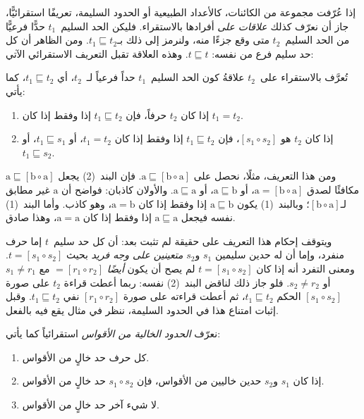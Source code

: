 \documentclass[../../../include/open-logic-section]{subfiles}
\begin{document}


إذا عُرّفت مجموعة من الكائنات، كالأعداد الطبيعية أو الحدود السليمة،
تعريفًا استقرائيًّا، جاز أن نعرّف كذلك \emph{علاقات على} أفرادها
بالاستقراء. فليكن الحد السليم~$t_1$ حدًّا فرعيًّا من الحد السليم~$t_2$
متى وقع جزءًا منه، ولنرمز إلى ذلك بـ$t_1 \sqsubseteq t_2$. ومن الظاهر
أن كل حد سليم فرع من نفسه: $t \sqsubseteq t$. وهذه العلاقة تقبل
التعريف الاستقرائي الآتي:

\begin{defn}
  تُعرَّف بالاستقراء على~$t_2$ علاقةُ كون الحد السليم~$t_1$ حداً فرعياً
  لـ~$t_2$، أي $t_1 \sqsubseteq t_2$، كما يأتي:
  \begin{enumerate}
  \item إذا كان $t_2$ حرفاً، فإن $t_1 \sqsubseteq t_2$ إذا وفقط إذا كان
    $t_1 = t_2$.
  \item إذا كان $t_2$ هو $[s_1 \circ s_2]$، فإن
    $t_1 \sqsubseteq t_2$ إذا وفقط إذا كان $t_1 = t_2$، أو
    $t_1 \sqsubseteq s_1$، أو $t_1 \sqsubseteq s_2$.
  \end{enumerate}
\end{defn}

ومن هذا التعريف، مثلًا، نحصل على $
\mathrm{a} \sqsubseteq [\mathrm{b} \circ \mathrm{a}]$. فإن البند~(2)
يجعل $
\mathrm{a} \sqsubseteq [\mathrm{b} \circ \mathrm{a}]$ مكافئًا لصدق
$\mathrm{a} = [\mathrm{b} \circ \mathrm{a}]$، أو
$\mathrm{a} \sqsubseteq \mathrm{b}$، أو
$\mathrm{a} \sqsubseteq \mathrm{a}$. والأولان كاذبان: فواضح أن
$\mathrm{a}$ غير مطابق لـ$[\mathrm{b} \circ \mathrm{a}]$؛ وبالبند~(1)
يكون $\mathrm{a} \sqsubseteq \mathrm{b}$ إذا وفقط إذا كان
$\mathrm{a} = \mathrm{b}$، وهو كاذب. وأما البند~(1) نفسه فيجعل
$\mathrm{a} \sqsubseteq \mathrm{a}$ إذا وفقط إذا كان
$\mathrm{a} = \mathrm{a}$، وهذا صادق.

ويتوقف إحكام هذا التعريف على حقيقة لم تثبت بعد: أن كل حد سليم~$t$
إما حرف منفرد، وإما أن له حدين سليمين $s_1$ و$s_2$
\emph{متعينين على وجه فريد} بحيث $t = [s_1 \circ s_2]$. ومعنى التفرد
أنه إذا كان $t = [s_1 \circ s_2]$ لم يصح أن يكون \emph{أيضًا}
$= [r_1 \circ r_2]$ مع $s_1 \neq r_1$ أو $s_2 \neq r_2$.
فلو جاز ذلك لناقض البند~(2) نفسه: ربما أعطت قراءة $t_2$ على صورة
$[s_1 \circ s_2]$ الحكم $t_1 \sqsubseteq t_2$، ثم أعطت قراءته على
صورة $[r_1 \circ r_2]$ نفي $t_1 \sqsubseteq t_2$. وقبل إثبات امتناع
هذا في الحدود السليمة، ننظر في مثال يقع فيه بالفعل.

\begin{defn}
  نعرّف \emph{الحدود الخالية من الأقواس} استقرائياً كما يأتي:
  \begin{enumerate}
  \item كل حرف حد خالٍ من الأقواس.
  \item إذا كان $s_1$ و$s_2$ حدين خاليين من الأقواس، فإن
    $s_1 \circ s_2$ حد خالٍ من الأقواس.
  \item لا شيء آخر حد خالٍ من الأقواس.
  \end{enumerate}
\end{defn}
\end{document}
